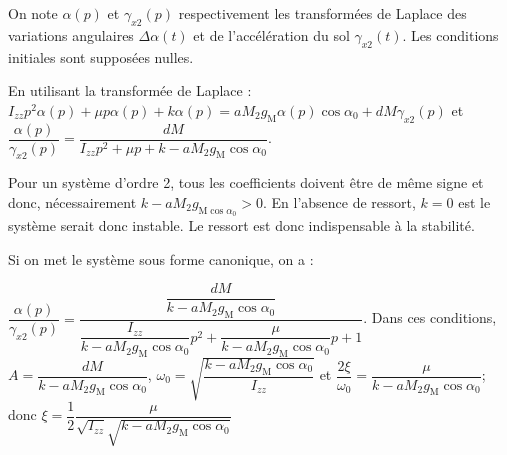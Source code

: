 On note $\alpha(p)$ et $\gamma_{x 2}(p)$ respectivement les transformées de Laplace des variations angulaires $\Delta \alpha(t)$ et de l'accélération du sol $\gamma_{x 2}(t)$. Les conditions initiales sont supposées nulles.

\ifprof
\begin{corrige}
En utilisant la transformée de Laplace : $ 
I_{z z} p^2 {\alpha}(p)+\mu p{\alpha}(p)+k\alpha(p)
=a M_{2} g_{\mathrm{M}} \alpha(p) \cos \alpha_{0} +d M \gamma_{x 2}(p)
$ et 
$\dfrac{\alpha(p)}{\gamma_{x 2}(p)} = \dfrac{d M }{I_{z z} p^2  +\mu p +k -a M_{2} g_{\mathrm{M}}  \cos \alpha_{0}}$.

Pour un système d'ordre 2, tous les coefficients doivent être de même signe et donc, nécessairement 
$k -a M_{2} g_{\mathrm{M}  \cos \alpha_{0}} >0$. En l'absence de ressort, $k=0$ est le système serait donc instable. Le ressort est donc indispensable à la stabilité.
\end{corrige}
\else
\fi

\ifprof
\begin{corrige}
Si on met le système sous forme canonique, on a :

$\dfrac{\alpha(p)}{\gamma_{x 2}(p)} = \dfrac{\dfrac{d M}{k -a M_{2} g_{\mathrm{M}}  \cos \alpha_{0}}}{\dfrac{I_{z z}}{k -a M_{2} g_{\mathrm{M}}  \cos \alpha_{0}} p^2  +\dfrac{\mu}{k -a M_{2} g_{\mathrm{M}}  \cos \alpha_{0}}p +1}$.
Dans ces conditions, $A=\dfrac{d M}{k -a M_{2} g_{\mathrm{M}}  \cos \alpha_{0}}$, $\omega_0 = \sqrt{
\dfrac{k -a M_{2} g_{\mathrm{M}}  \cos \alpha_{0}}{I_{z z}}
}$ 
et $\dfrac{2\xi}{\omega_0} = \dfrac{\mu}{k -a M_{2} g_{\mathrm{M}}  \cos \alpha_{0}}$; donc 
$\xi =  \dfrac{1}{2}\dfrac{\mu}{\sqrt{I_{z z}}\sqrt{k -a M_{2} g_{\mathrm{M}}  \cos \alpha_{0}}} 
$

\end{corrige}
\else
\fi

